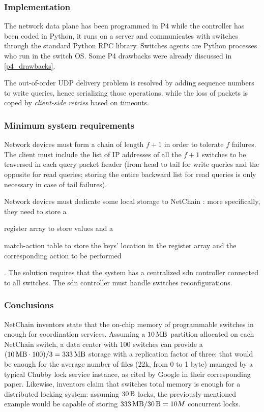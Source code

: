 \subsubsection{Implementation}
The network data plane has been programmed in P4 \cite{p4} while the controller has been coded in Python, it runs on a server and communicates with switches through the standard Python RPC library. Switches agents are Python processes who run in the switch OS. Some P4 \cite{p4} drawbacks were already discussed in \cref{p4_drawbacks}.\par
The out-of-order UDP delivery problem is resolved by adding sequence numbers to write queries, hence serializing those operations, while the loss of packets is coped by \textit{client-side retries} based on timeouts.

\subsubsection{Minimum system requirements}
Network devices must form a chain of length $f + 1$ in order to tolerate $f$ failures. The client must include the list of IP addresses of all the $f + 1$ switches to be traversed in each query packet header (from head to tail for write queries and the opposite
for read queries; storing the entire backward list for read queries is only necessary in case of tail failures).\par
Network devices must dedicate some local storage to NetChain \cite{netchain}: more specifically, they need to store a
\begin{mylist}
    \item register array to store values and a
    \item match-action table to store the keys' location in the register array and the corresponding action to be performed
\end{mylist}.
The solution requires that the system has a centralized \gls{sdn} controller connected to all switches.
The \gls{sdn} controller must handle switches reconfigurations.

\subsubsection{Conclusions}
NetChain \cite{netchain} inventors state that the on-chip memory of programmable switches in enough for coordination services.
Assuming a $\SI{10}{\mega\byte}$ partition allocated on each NetChain \cite{netchain} switch, a data center with 100 switches can provide a $(\SI{10}{\mega\byte} \cdot 100) / 3 = \SI{333}{\mega\byte}$ storage with a replication factor of three: that would be enough for the average number of files (22k, from 0 to 1 byte) managed by a typical Chubby \cite{chubby} lock service instance, as cited by Google in their corresponding paper.
Likewise, inventors claim that switches total memory is enough for a distributed locking system: assuming $\SI{30}{\byte}$ locks, the previously-mentioned example would be capable of storing $\SI{333}{\mega\byte} / \SI{30}{\byte} = 10M$ concurrent locks.